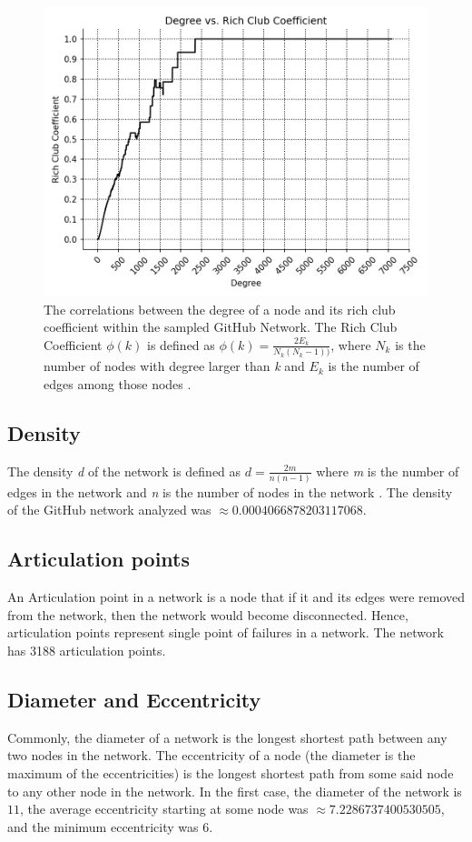 \documentclass[9pt,twocolumn,twoside]{pnas-new}
\begin{document}
\begin{figure}
\centering
\includegraphics[width=.8\linewidth]{rich_club_coefficients}
\caption{The correlations between the degree of a node and its rich club coefficient within the sampled GitHub Network. The Rich Club Coefficient $\phi(k)$ is defined as $\phi(k)=\frac{2E_{k}}{N_{k}(N_{k} - 1))}$, where $N_{k}$ is the number of nodes with degree larger than \textit{k} and $E_{k}$ is the number of edges among those nodes \cite{networkxrichclubcoefficients}.
}
\label{fig:rich_club_coefficients}
\end{figure}

\subsection*{Density} The density \textit{d} of the network is defined as 
$d= \frac{2m}{n(n-1)}$
where \textit{m} is the number of edges in the network and \textit{n} is the number of nodes in the network \cite{networkxdensity}. The density of the GitHub network analyzed was $\approx 0.0004066878203117068$.

\subsection*{Articulation points} An Articulation point in a network is a node that if it and its edges were removed from the network, then the network would become disconnected. Hence, articulation points represent single point of failures in a network. The network has 3188 articulation points.

\subsection*{Diameter and Eccentricity} Commonly, the diameter of a network is the longest shortest path between any two nodes in the network. The eccentricity of a node (the diameter is the maximum of the eccentricities) is the longest shortest path from some said node to any other node in the network. In the first case, the diameter of the network is $11$, the average eccentricity starting at some node was $\approx 7.2286737400530505$, and the minimum eccentricity was $6$.
\end{document}
